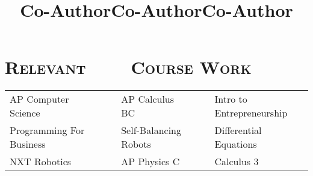 \begin{resume}
\title{Co-Author}
\begin{position}
\end{position}

\title{Co-Author}
\begin{position}
\end{position}

\title{Co-Author}
\begin{position}
\end{position}

\section{\textsc{Relevant \ \ \ \ Course Work}}
  \begin{tabular}{lllll}
  AP Computer Science      & \ \ & AP Calculus BC        & \ \ & Intro to Entrepreneurship \\ 
  Programming For Business & \ \ & Self-Balancing Robots & \ \ & Differential Equations \\
  NXT Robotics             & \ \ & AP Physics C          & \ \ & Calculus 3 \\
  \end{tabular}

\end{resume}


